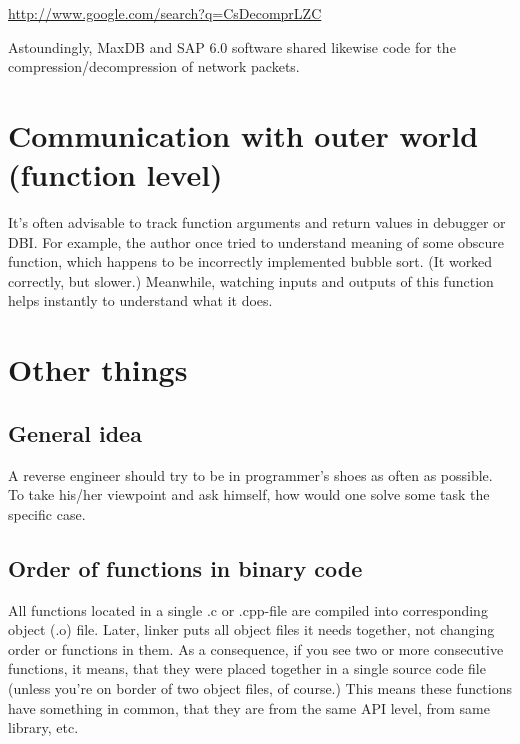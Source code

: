 \url{http://www.google.com/search?q=CsDecomprLZC}

Astoundingly, MaxDB and SAP 6.0 software shared likewise code for the compression/decompression of network packets.




\section{Communication with outer world (function level)}
It's often advisable to track function arguments and return values in debugger or \ac{DBI}.
For example, the author once tried to understand meaning of some obscure function, which happens to be incorrectly
implemented bubble sort.
(It worked correctly, but slower.)
Meanwhile, watching inputs and outputs of this function helps instantly to understand what it does.%









\section{Other things}

\subsection{General idea}

A reverse engineer should try to be in programmer's shoes as often as possible. 
To take his/her viewpoint and ask himself, how would one solve some task the specific case.

\subsection{Order of functions in binary code}

All functions located in a single .c or .cpp-file are compiled into corresponding object (.o) file.
Later, linker puts all object files it needs together, not changing order or functions in them.
As a consequence, if you see two or more consecutive functions, it means, that they were placed together
in a single source code file (unless you're on border of two object files, of course.)
This means these functions have something in common, that they are from the same \ac{API} level, from same library, etc.

